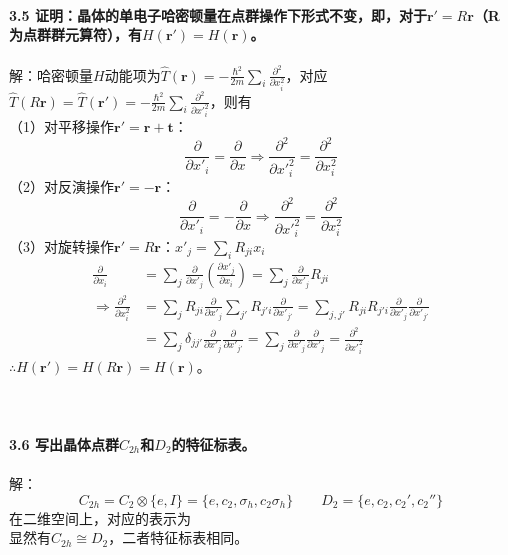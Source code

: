 \documentclass[12pt]{article}
\numberwithin{equation}{section}	 %
\begin{document}
\begin{spacing}{1.5}
~\\
~\\
~\\
\textbf{3.5 \quad 证明：晶体的单电子哈密顿量在点群操作下形式不变，即，对于$\bm{r'} = R\bm{r}$（R为点群群元算符），有$H(\bm{r}') = H(\bm{r})$。}\\
~\\
解：哈密顿量$H$动能项为$\displaystyle \hat{T}(\bm{r}) = -\frac{\hbar^{2}}{2m}\sum_{i}\frac{\partial^{2}}{\partial x_{i}^{2}}$，对应$\displaystyle \hat{T}(R\bm{r}) = \hat{T}(\bm{r'}) = -\frac{\hbar^{2}}{2m}\sum_{i}\frac{\partial^{2}}{\partial {x'}_{i}^{2}}$，则有 \\
（1）对平移操作$\bm{r'} = \bm{r} + \bm{t}$：
\begin{equation}
\frac{\partial}{\partial x'_{i}} = \frac{\partial}{\partial x} \Longrightarrow \frac{\partial^{2}}{\partial {x'}_{i}^{2}} = \frac{\partial^{2}}{\partial x_{i}^{2}}
\end{equation}
（2）对反演操作$\bm{r'} = -\bm{r}$：
\begin{equation}
\frac{\partial}{\partial x'_{i}} = -\frac{\partial}{\partial x} \Longrightarrow \frac{\partial^{2}}{\partial {x'}_{i}^{2}} = \frac{\partial^{2}}{\partial x_{i}^{2}}
\end{equation}
（3）对旋转操作$\bm{r'} = R\bm{r}$：$\displaystyle x'_{j} = \sum_{i}R_{ji}x_{i}$
\begin{align*}
\frac{\partial}{\partial x_{i}} &= \sum_{j} \frac{\partial}{\partial x'_{j}} \left(\frac{\partial x'_{j}}{\partial x_{i}}\right) = \sum_{j} \frac{\partial}{\partial x'_{j}}R_{ji} \\
\Longrightarrow \frac{\partial^{2}}{\partial x_{i}^{2}} &= \sum_{j}R_{ji}\frac{\partial}{\partial x'_{j}} \sum_{j'}R_{j'i}\frac{\partial}{\partial x'_{j'}} = \sum_{j,j'} R_{ji}R_{j'i} \frac{\partial}{\partial x'_{j}}\frac{\partial}{\partial x'_{j'}} \\
&= \sum_{j}\delta_{jj'}\frac{\partial}{\partial x'_{j}}\frac{\partial}{\partial x'_{j'}} = \sum_{j}\frac{\partial}{\partial x'_{j}}\frac{\partial}{\partial x'_{j}} = \frac{\partial^{2}}{\partial {x'}_{i}^{2}}
\end{align*}
$\therefore H(\bm{r}') = H(R\bm{r}) = H(\bm{r})$。\\
~\\
~\\
~\\
\textbf{3.6 \quad 写出晶体点群$C_{2h}$和$D_{2}$的特征标表。}\\
~\\
解：
\begin{equation}\nonumber 		%
C_{2h} = C_{2} \otimes \{e,I\} =\{e,c_{2},\sigma_{h},c_{2}\sigma_{h}\} \qquad D_{2} = \{e,c_{2},c_{2}',c_{2}''\}
\end{equation}
在二维空间上，对应的表示为\\
显然有$C_{2h} \cong D_{2}$，二者特征标表相同。\\		 %


\end{spacing}
\end{document}
